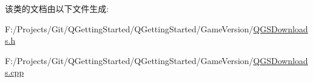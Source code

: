 该类的文档由以下文件生成\+:\begin{DoxyCompactItemize}
\item 
F\+:/\+Projects/\+Git/\+Q\+Getting\+Started/\+Q\+Getting\+Started/\+Game\+Version/\mbox{\hyperlink{_q_g_s_downloads_8h}{Q\+G\+S\+Downloads.\+h}}\item 
F\+:/\+Projects/\+Git/\+Q\+Getting\+Started/\+Q\+Getting\+Started/\+Game\+Version/\mbox{\hyperlink{_q_g_s_downloads_8cpp}{Q\+G\+S\+Downloads.\+cpp}}\end{DoxyCompactItemize}
